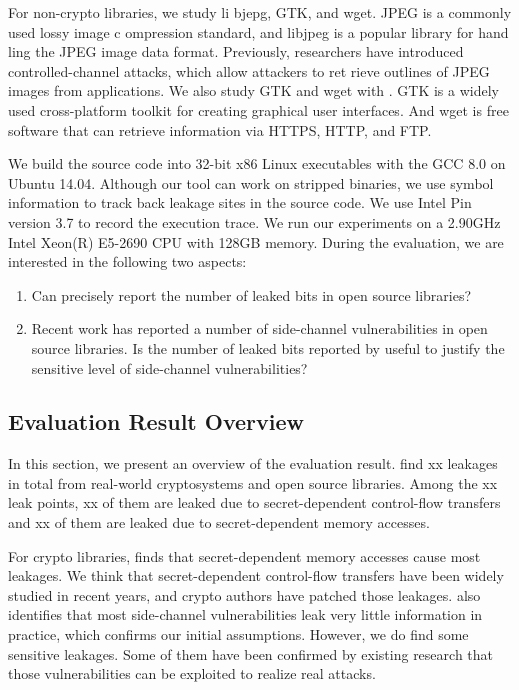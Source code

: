 For non-crypto libraries, we study li bjepg, GTK, and wget.
JPEG is a commonly used lossy image c ompression standard, and
libjpeg is a popular library for hand ling the JPEG image data
format. Previously, researchers have  introduced controlled-channel
attacks, which allow attackers to ret rieve outlines of JPEG images
from applications. We also study GTK  and wget with \tool{}. GTK 
is a widely used cross-platform toolkit for creating graphical user
interfaces. And wget is free software that can retrieve information
via HTTPS, HTTP, and FTP.

We build the source code into 32-bit x86 Linux executables with the 
GCC 8.0 on Ubuntu 14.04. Although our tool can
work on stripped binaries, we use symbol information to track
back leakage sites in the source code. We use Intel Pin version 3.7 
to record the execution trace. We run our experiments on a 2.90GHz
Intel Xeon(R) E5-2690 CPU with 128GB memory.
During the evaluation, we are interested in the following two
aspects:
\begin{enumerate}
    
    \item  Can \tool{} precisely
    report the number of leaked bits in open source libraries?
    \item  Recent work has reported a number
    of side-channel vulnerabilities in open source libraries. 
    Is the number of leaked bits reported by \tool{} useful to justify 
    the sensitive level of side-channel vulnerabilities?
   
\end{enumerate}

\subsection{Evaluation Result Overview}
In this section, we present an overview of the evaluation result. 
\tool{} find xx leakages in total from real-world cryptosystems and open
source libraries. Among the xx leak points, xx of them are leaked due
to secret-dependent control-flow transfers and xx of them are leaked 
due to secret-dependent memory accesses. 

For crypto libraries, \tool{} finds that secret-dependent memory accesses 
cause most leakages. We think that secret-dependent
control-flow transfers have been widely studied in recent years, 
and crypto authors have patched those leakages.
\tool{} also identifies that most side-channel vulnerabilities 
leak very little information in practice, which confirms our initial
assumptions. 
However, we do find some sensitive leakages. 
Some of them have been confirmed by existing research that those 
vulnerabilities can be exploited
to realize real attacks. 

